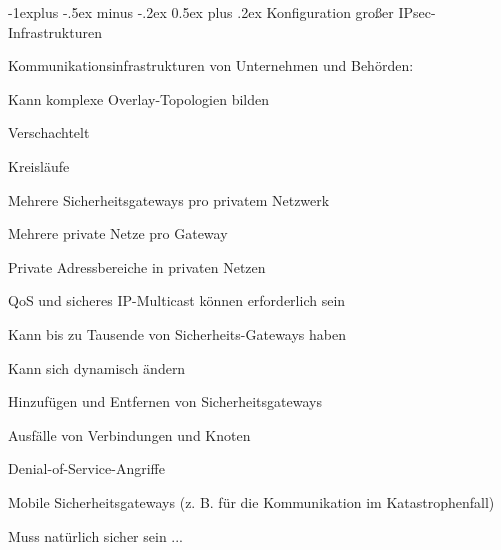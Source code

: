 \documentclass[a4paper]{article}
\makeatletter
\renewcommand{\subsection}{\@startsection{subsection}{2}{0mm}%
 {-1explus -.5ex minus -.2ex}%
 {0.5ex plus .2ex}%
 {\normalfont\normalsize\bfseries}}
\makeatother
\begin{document}
\begin{multicols}{3}
\begin{itemize*}
            \subsection{Konfiguration großer
                  IPsec-Infrastrukturen}
            \begin{itemize*}
                  \item       Kommunikationsinfrastrukturen von Unternehmen und Behörden:
                  \item       Kann komplexe Overlay-Topologien bilden
                  \begin{itemize*}
                        \item Verschachtelt
                        \item Kreisläufe
                        \item Mehrere Sicherheitsgateways pro privatem Netzwerk
                        \item Mehrere private Netze pro Gateway
                        \item Private Adressbereiche in privaten Netzen
                        \item QoS und sicheres IP-Multicast können erforderlich sein
                  \end{itemize*}
                  \item       Kann bis zu Tausende von Sicherheits-Gateways haben
                  \item       Kann sich dynamisch ändern
                  \begin{itemize*}
                        \item Hinzufügen und Entfernen von Sicherheitsgateways
                        \item Ausfälle von Verbindungen und Knoten
                        \item Denial-of-Service-Angriffe
                        \item Mobile Sicherheitsgateways (z. B. für die Kommunikation im Katastrophenfall)
                  \end{itemize*}
                  \item       Muss natürlich sicher sein ...
            \end{itemize*}


\end{itemize*}
\end{multicols}
\end{document}

